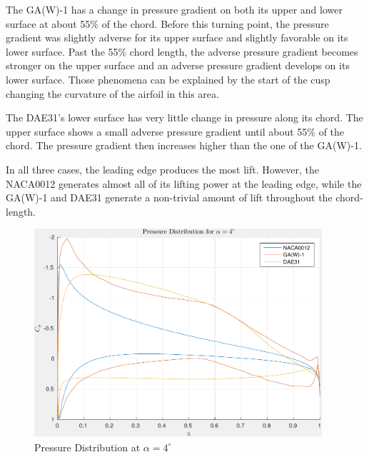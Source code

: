 \documentclass[letterpaper,12pt,]{article}
\begin{document}
The GA(W)-1 has a change in pressure gradient on both its upper and lower surface at about 55\% of the chord.
Before this turning point, the pressure gradient was slightly adverse for its upper surface and slightly favorable on its lower surface.
Past the 55\% chord length, the adverse pressure gradient becomes stronger on the upper surface and an adverse pressure gradient develops on its lower surface.
Those phenomena can be explained by the start of the cusp changing the curvature of the airfoil in this area.

The DAE31's lower surface has very little change in pressure along its chord. The upper surface shows a small adverse pressure gradient until about 55\% of the chord. The pressure gradient then increases higher than the one of the GA(W)-1.

In all three cases, the leading edge produces the most lift.
However, the NACA0012 generates almost all of its lifting power at the leading edge, while the GA(W)-1 and DAE31 generate a non-trivial amount of lift throughout the chord-length.

\begin{figure}[!h]
    \centering
    \includegraphics[width = 0.95\textwidth]{./figures/q4pressure.pdf}
    \caption{Pressure Distribution at $\alpha = 4^\circ$}
    \label{fig:q4c}
\end{figure}
\end{document}
